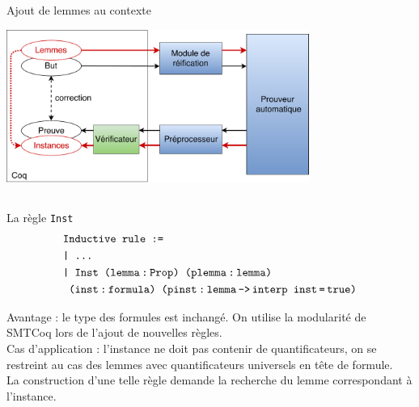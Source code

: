 \documentclass{beamer}
\begin{document}
    \subsection{}
    \begin{frame}{Ajout de lemmes au contexte}
      \begin{center}
        \includegraphics[height=5cm]{ajout_lemmes.pdf}
      \end{center}
    \end{frame}




    \subsection{}
    \begin{frame}{La règle \texttt{Inst}}
      \begin{align*}
        &\texttt{Inductive rule :=}\\
        &\texttt{| ... } \\
        &\texttt{| Inst }\texttt{(lemma\,:\,Prop) (plemma\,:\,lemma)} \\
        &\texttt{         (inst\,:}\texttt{\,formula) (pinst\,:\,lemma\,->\,interp inst\,=\,true)}
      \end{align*}

      Avantage : le type des formules est inchangé. On utilise la modularité de SMTCoq lors de l'ajout de nouvelles règles.  \\
      \vspace{0.3cm}
      Cas d'application : l'instance ne doit pas contenir de quantificateurs, on se restreint au cas des lemmes avec quantificateurs universels en tête de formule. \\
      \vspace{0.3cm}
      La construction d'une telle règle demande la recherche du lemme correspondant à l'instance.
    \end{frame}
\end{document}
